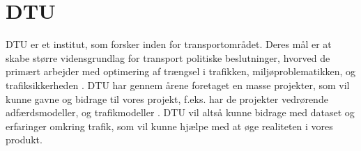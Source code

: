 \section{DTU}
\label{sec:DTU}
DTU er et institut, som forsker inden for transportområdet. Deres mål er at skabe større vidensgrundlag for transport politiske beslutninger, hvorved de primært arbejder med optimering af trængsel i trafikken, miljøproblematikken, og trafiksikkerheden \cite{DtuForskning}. DTU har gennem årene foretaget en masse projekter, som vil kunne gavne og bidrage til vores projekt, f.eks. har de projekter vedrørende adfærdsmodeller, og trafikmodeller \cite{DtuProjekter}. DTU vil altså kunne bidrage med dataset og erfaringer omkring trafik, som vil kunne hjælpe med at øge realiteten i vores produkt.

